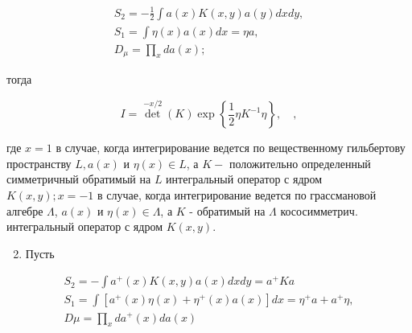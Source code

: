 \documentclass[10pt]{article}
\begin{document}
\[

\begin{gathered}

S_{2}=-\frac{1}{2} \int a(x) K(x, y) a(y) d x d y, \\

S_{1}=\int \eta(x) a(x) d x=\eta a, \\

D_{\mu}=\prod_{x} d a(x) ;

\end{gathered}

\]



тогда



\[

I=\operatorname{det}^{-x / 2}(K) \exp \left\{\frac{1}{2} \eta K^{-1} \eta\right\}, \quad,

\]



где $x=1$ в случае, когда интегрирование ведется по вещественному гильбертову пространству $L, a(x)$ и $\eta(x) \in L$, а $K-$ положительно определенный симметричный обратимый на $L$ интегральный оператор с ядром $K(x, y) ; x=-1$ в случае, когда интегрирование ведется по грассмановой алгебре $\Lambda$, $a(x)$ и $\eta(x) \in \Lambda$, а $K$ - обратимый на $\Lambda$ кососимметрич. интегральный оператор с ядром $K(x, y)$.



\begin{enumerate}

  \setcounter{enumi}{1}

  \item Пусть

\end{enumerate}



\[

\begin{gathered}

S_{2}=-\int a^{+}(x) K(x, y) a(x) d x d y=a^{+} K a \\

S_{1}=\int\left[a^{+}(x) \eta(x)+\eta^{+}(x) a(x)\right] d x=\eta^{+} a+a^{+} \eta, \\

D \mu=\prod_{x} d a^{+}(x) d a(x)

\end{gathered}

\]
\end{document}
